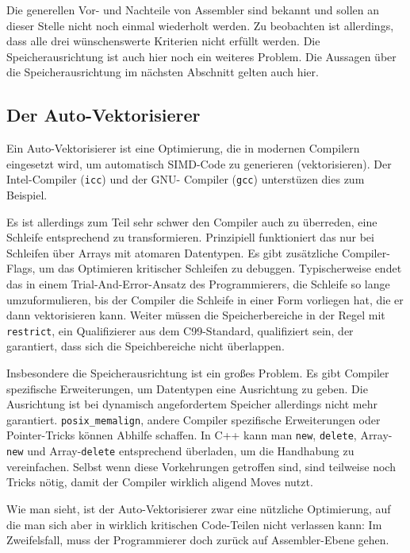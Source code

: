 \documentclass[a4paper,10pt]{article}
\begin{document}
Die generellen Vor- und Nachteile von Assembler sind bekannt und sollen an dieser Stelle nicht noch
einmal wiederholt werden. Zu beobachten ist allerdings, dass alle drei wünschenswerte Kriterien
nicht erfüllt werden. Die Speicherausrichtung ist auch hier noch ein weiteres Problem. Die Aussagen
über die Speicherausrichtung im nächsten Abschnitt gelten auch hier.

\subsection{Der Auto-Vektorisierer}

Ein Auto-Vektorisierer ist eine Optimierung, die in modernen Compilern eingesetzt wird, um
automatisch SIMD-Code zu generieren (vektorisieren). Der Intel-Compiler (\texttt{icc}) und der GNU-
Compiler (\texttt{gcc}) unterstüzen dies zum Beispiel. 

Es ist allerdings zum Teil sehr schwer den Compiler auch zu überreden, eine Schleife entsprechend zu
transformieren. Prinzipiell funktioniert das nur bei Schleifen über Arrays mit atomaren Datentypen.
Es gibt zusätzliche Compiler-Flags, um das Optimieren kritischer Schleifen zu debuggen.
Typischerweise endet das in einem Trial-And-Error-Ansatz des Programmierers, die Schleife so lange
umzuformulieren, bis der Compiler die Schleife in einer Form vorliegen hat, die er dann
vektorisieren kann. Weiter müssen die Speicherbereiche in der Regel mit \texttt{restrict}, ein
Qualifizierer aus dem C99-Standard, qualifiziert sein, der garantiert, dass sich die Speichbereiche
nicht überlappen.

Insbesondere die Speicherausrichtung ist ein großes Problem. Es gibt Compiler spezifische
Erweiterungen, um Datentypen eine Ausrichtung zu geben. Die Ausrichtung ist bei dynamisch
angefordertem Speicher allerdings nicht mehr garantiert. \texttt{posix\_memalign}, andere Compiler
spezifische Erweiterungen oder Pointer-Tricks können Abhilfe schaffen. In C++ kann man \texttt{new},
\texttt{delete}, Array-\texttt{new} und Array-\texttt{delete} entsprechend überladen, um die
Handhabung zu vereinfachen. Selbst wenn diese Vorkehrungen getroffen sind, sind teilweise noch
Tricks nötig, damit der Compiler wirklich aligend Moves nutzt.

Wie man sieht, ist der Auto-Vektorisierer zwar eine nützliche Optimierung, auf die man sich aber in wirklich
kritischen Code-Teilen nicht verlassen kann: Im Zweifelsfall, muss der Programmierer doch zurück auf 
Assembler-Ebene gehen.
\end{document}
